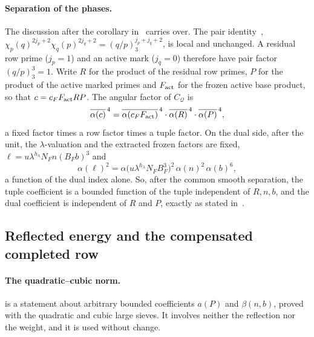 \documentclass[11pt]{article}
\numberwithin{equation}{section}
\begin{document}
\paragraph{Separation of the phases.} The discussion after the corollary in~\cite[Section~14.2]{OAI78} carries over.
The pair identity~\cite[eq.~(14.5)]{OAI78},
$\chi_p(q)^{2j_p+2}\chi_q(p)^{2j_q+2}=(q/p)_3^{j_p+j_q+2}$, is local and unchanged. A residual row prime ($j_p=1$) and
an active mark ($j_q=0$) therefore have pair factor $(q/p)_3^3=1$. Write $R$ for the product of the residual row
primes, $P$ for the product of the active marked primes and $F_{\rm act}$ for the frozen active base product, so that
$c=c_FF_{\rm act}RP$. The angular factor of $C_{\mathcal Q}$ is
\begin{equation}\label{eq:d140}
 \overline{\alpha(c)}^{\,4}=\overline{\alpha(c_FF_{\rm act})}^{\,4}\cdot\overline{\alpha(R)}^{\,4}\cdot
 \overline{\alpha(P)}^{\,4},
\end{equation}
a fixed factor times a row factor times a tuple factor. On the dual side, after the unit, the
$\lambda$-valuation and the extracted frozen factors are fixed, $\ell=u\lambda^{h_\lambda}N_Fn(B_Fb)^3$ and
\begin{equation}\label{eq:d141}
 \alpha(\ell)^2=\alpha\bigl(u\lambda^{h_\lambda}N_FB_F^3\bigr)^2\,\alpha(n)^2\,\alpha(b)^6,
\end{equation}
a function of the dual index alone. So, after the common smooth separation, the tuple coefficient is a bounded
function of the tuple independent of $R,n,b$, and the dual coefficient is independent of $R$ and $P$, exactly as stated
in~\cite[Section~14.2]{OAI78}.

\subsection{Reflected energy and the compensated completed row}\label{sec:s1-energy}

\paragraph{The quadratic--cubic norm.} \cite[Lemma~14.2]{OAI78} is a statement about
arbitrary bounded coefficients $a(P)$ and $\beta(n,b)$, proved with the quadratic and cubic large sieves. It involves
neither the reflection nor the weight, and it is used without change.
\end{document}
